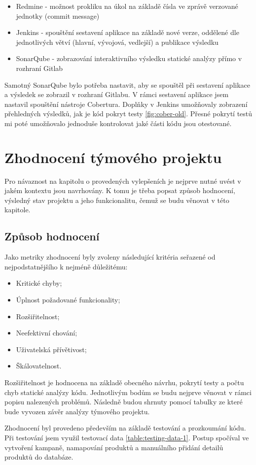 \documentclass[thesis=B,czech]{FITthesis}[2012/06/26]
\begin{document}
\begin{itemize}
\item Redmine - možnost prokliku na úkol na základě čísla ve zprávě verzované jednotky (commit message)
\item Jenkins - spouštění sestavení aplikace na základě nové verze, oddělené dle jednotlivých větví (hlavní, vývojová, vedlejší) a
				publikace výsledku
\item SonarQube - zobrazování interaktivního výsledku statické analýzy přímo v rozhraní Gitlab
\end{itemize}

Samotný SonarQube bylo potřeba nastavit, aby se spouštěl při sestavení aplikace a výsledek se zobrazil v rozhraní
Gitlabu. V rámci sestavení aplikace jsem nastavil spouštění nástroje Cobertura.
Doplňky v Jenkins umožňovaly zobrazení přehledných výsledků, jak je kód pokryt testy \ref{fig:cober-old}. Přesné pokrytí testů mi poté umožňovalo 
jednoduše kontrolovat jaké části kódu jsou otestované.


\chapter{Zhodnocení týmového projektu}
Pro návaznost na kapitolu o provedených vylepšeních je nejprve nutné uvést v jakém kontextu jsou navrhovány. K tomu je třeba
popsat způsob hodnocení, výsledný stav projektu a jeho funkcionalitu, čemuž se budu věnovat v této kapitole.

\section{Způsob hodnocení}\label{sec:zhodnoceni-typ}
Jako metriky zhodnocení byly zvoleny následující kritéria seřazené od nejpodstatnějšího k nejméně důležitému: 

\begin{itemize}
\item Kritické chyby;
\item Úplnost požadované funkcionality;
\item Rozšiřitelnost;
\item Neefektivní chování;
\item Uživatelská přívětivost;
\item Škálovatelnost.
\end{itemize}

Rozšiřitelnost je hodnocena na základě obecného návrhu, pokrytí testy a počtu chyb statické analýzy kódu. 
Jednotlivým bodům se budu nejprve věnovat v rámci popisu nalezených problémů. Následně budou shrnuty pomocí tabulky ze které
bude vyvozen závěr analýzy týmového projektu.
\par
Zhodnocení byl provedeno především na základě testování a prozkoumání kódu.
Při testování jsem využil testovací data \ref{table:testing-data-1}. Postup spočíval ve vytvoření kampaně, namapování
produktů a manuálního přidání detailů produktů do databáze.
\end{document}
